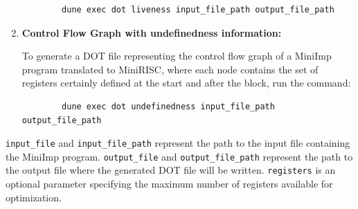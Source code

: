 \documentclass[a4paper,11pt]{report}
\begin{document}
\begin{enumerate}
	\begin{verbatim}
		dune exec dot liveness input_file_path output_file_path
	\end{verbatim}
	
	\item \textbf{Control Flow Graph with undefinedness information:}
	
	To generate a DOT file representing the control flow graph of a MiniImp program translated to MiniRISC, where each node contains the set of registers certainly defined at the start and after the block, run the command:
	
	\begin{verbatim}
		dune exec dot undefinedness input_file_path output_file_path
	\end{verbatim}
\end{enumerate}

\texttt{input\_file} and \texttt{input\_file\_path} represent the path to the input file containing the MiniImp program.
\texttt{output\_file} and \texttt{output\_file\_path} represent the path to the output file where the generated DOT file will be written.
\texttt{registers} is an optional parameter specifying the maximum number of registers available for optimization.
\end{document}

